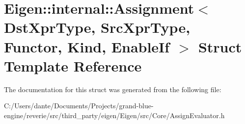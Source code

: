 \hypertarget{struct_eigen_1_1internal_1_1_assignment}{}\section{Eigen\+::internal\+::Assignment$<$ Dst\+Xpr\+Type, Src\+Xpr\+Type, Functor, Kind, Enable\+If $>$ Struct Template Reference}
\label{struct_eigen_1_1internal_1_1_assignment}


The documentation for this struct was generated from the following file\+:\begin{DoxyCompactItemize}
\item 
C\+:/\+Users/dante/\+Documents/\+Projects/grand-\/blue-\/engine/reverie/src/third\+\_\+party/eigen/\+Eigen/src/\+Core/Assign\+Evaluator.\+h\end{DoxyCompactItemize}
